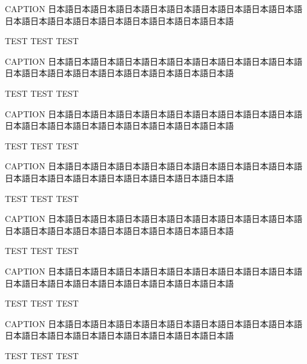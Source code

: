 \begin{rv@outerarcbox@caption}{CAPTION}
日本語日本語日本語日本語日本語日本語日本語日本語日本語日本語日本語日本語日本語日本語日本語日本語日本語日本語日本語

TEST TEST TEST

\end{rv@outerarcbox@caption}

\clearpage

\begin{rv@squareboxtopleft@caption}{CAPTION}
日本語日本語日本語日本語日本語日本語日本語日本語日本語日本語日本語日本語日本語日本語日本語日本語日本語日本語日本語

TEST TEST TEST

\end{rv@squareboxtopleft@caption}

\begin{rv@squareboxtopcenter@caption}{CAPTION}
日本語日本語日本語日本語日本語日本語日本語日本語日本語日本語日本語日本語日本語日本語日本語日本語日本語日本語日本語

TEST TEST TEST

\end{rv@squareboxtopcenter@caption}

\begin{rv@squareboxtopright@caption}{CAPTION}
日本語日本語日本語日本語日本語日本語日本語日本語日本語日本語日本語日本語日本語日本語日本語日本語日本語日本語日本語

TEST TEST TEST

\end{rv@squareboxtopright@caption}

\begin{rv@squareboxbottomleft@caption}{CAPTION}
日本語日本語日本語日本語日本語日本語日本語日本語日本語日本語日本語日本語日本語日本語日本語日本語日本語日本語日本語

TEST TEST TEST

\end{rv@squareboxbottomleft@caption}

\begin{rv@squareboxbottomcenter@caption}{CAPTION}
日本語日本語日本語日本語日本語日本語日本語日本語日本語日本語日本語日本語日本語日本語日本語日本語日本語日本語日本語

TEST TEST TEST

\end{rv@squareboxbottomcenter@caption}

\begin{rv@squareboxbottomright@caption}{CAPTION}
日本語日本語日本語日本語日本語日本語日本語日本語日本語日本語日本語日本語日本語日本語日本語日本語日本語日本語日本語

TEST TEST TEST

\end{rv@squareboxbottomright@caption}

